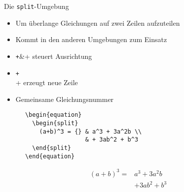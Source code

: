 \begin{frame}[fragile]{Die \texttt{split}-Umgebung}
  \begin{itemize}
    \item Um überlange Gleichungen auf zwei Zeilen aufzuteilen
    \item Kommt in den anderen Umgebungen zum Einsatz
    \item \texttt+&+ steuert Ausrichtung
    \item \texttt+\\+ erzeugt neue Zeile
    \item Gemeinsame Gleichungsnummer
  \end{itemize}
  \begin{CodeExample}{0.55}
    \begin{verbatim}
      \begin{equation}
        \begin{split}
          (a+b)^3 = {} & a^3 + 3a^2b \\
                       & + 3ab^2 + b^3
        \end{split}
      \end{equation}
    \end{verbatim}
  \CodeResult
    \begin{minipage}[c][6\baselineskip][c]{\textwidth}
      \begin{equation}
        \begin{split}
          (a+b)^3 = {} & a^3 + 3a^2b \\
                       & + 3ab^2 + b^3
        \end{split}
      \end{equation}
    \end{minipage}
  \end{CodeExample}
\end{frame}
